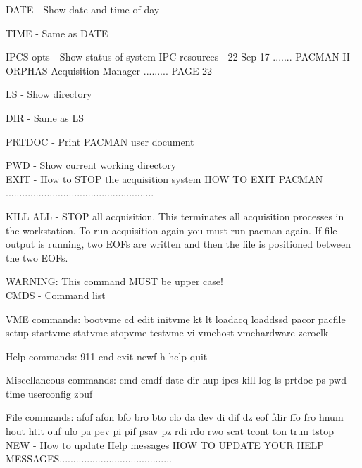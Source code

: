    DATE      - Show date and time of day
 
   TIME      - Same as DATE
 
   IPCS opts - Show status of system IPC resources
    
   22-Sep-17 ....... PACMAN II - ORPHAS Acquisition Manager ......... PAGE  22
 
 
   LS        - Show directory
 
   DIR       - Same as LS
 
   PRTDOC    - Print PACMAN user document
 
   PWD       - Show current working directory
   $$$$EXIT - How to STOP the acquisition system
   HOW TO EXIT PACMAN ......................................................
 
   KILL ALL  - STOP all acquisition.  This terminates all acquisition
               processes in the workstation.  To run acquisition again
               you must run pacman again.  If file output is running,
               two EOFs are written and then the file is positioned
               between the two EOFs.
 
               WARNING:  This command MUST be upper case!
   $$$$CMDS - Command list
 
   VME commands:
       bootvme       cd             edit          initvme
       kt            lt             loadacq       loaddssd
       pacor         pacfile        setup         startvme
       statvme       stopvme        testvme       vi
       vmehost       vmehardware    zeroclk
 
   Help commands:
       911           end            exit          newf
       h             help           quit
 
   Miscellaneous commands:
       cmd           cmdf           date          dir
       hup           ipcs           kill          log
       ls            prtdoc         ps            pwd
       time          userconfig     zbuf
 
   File commands:
       afof          afon          bfo           bro
       bto           clo           da            dev
       di            dif           dz            eof
       fdir          ffo           fro           hnum
       hout          htit          ouf           ulo
       pa            pev           pi            pif
       psav          pz            rdi           rdo
       rwo           scat          tcont         ton
       trun          tstop
   $$$$NEW  - How to update Help messages
   HOW TO UPDATE YOUR HELP MESSAGES.........................................
 
